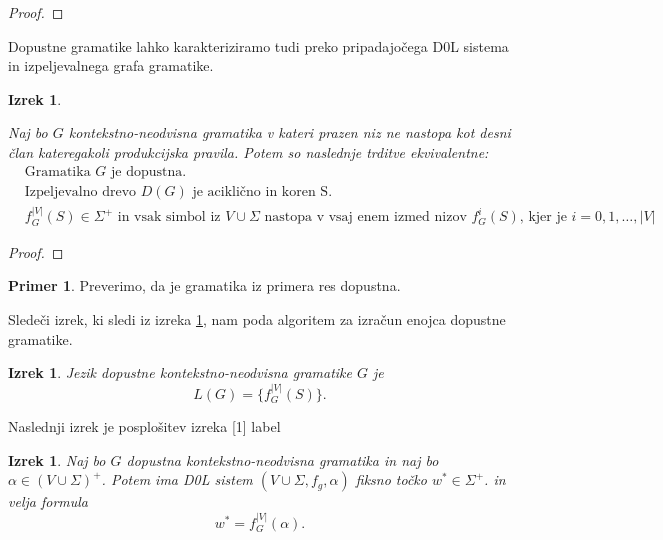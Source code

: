 \documentclass{amsart}
\theoremstyle{definition}
\newtheorem{primer}[definicija]{Primer}
\theoremstyle{plain} %
\newtheorem{izrek}[definicija]{Izrek}
\begin{document}
\begin{proof}

\end{proof}

Dopustne gramatike lahko karakteriziramo tudi preko pripadajočega D0L sistema in izpeljevalnega
grafa gramatike.

\begin{izrek}\label{ekvivalence}

    Naj bo $G$ kontekstno-neodvisna gramatika v kateri prazen niz ne nastopa kot desni član kateregakoli
    produkcijska pravila. Potem so naslednje trditve ekvivalentne:
    \begin{align}
        & \text{Gramatika } G \text{ je dopustna}. \\
        & \text{Izpeljevalno drevo } D(G) \text{ je aciklično in koren S}. \\
        & f_G^{|V|}(S) \in \Sigma^+ \text{ in vsak simbol iz } V \cup \Sigma \text{ nastopa v vsaj enem izmed nizov }
        f_G^i(S) \text{, kjer je } i = 0, 1, \ldots, |V|
    \end{align}

\end{izrek}

\setcounter{equation}{0}

\begin{proof}
    
\end{proof}

\begin{primer}
    Preverimo, da je gramatika iz primera res dopustna.
\end{primer}

Sledeči izrek, ki sledi iz izreka \ref{ekvivalence}, nam poda algoritem za izračun enojca dopustne gramatike.

\begin{izrek}

    Jezik dopustne kontekstno-neodvisna gramatike $G$ je
    \[
        L(G) = \{f_G^{|V|}(S) \}.
    \]

\end{izrek}

Naslednji izrek je posplošitev izreka [1] label 

\begin{izrek}

    Naj bo $G$ dopustna kontekstno-neodvisna gramatika in naj bo $ \alpha \in (V \cup \Sigma)^+ $.
    Potem ima D0L sistem $ (V \cup \Sigma, f_g, \alpha) $ fiksno točko $ w^* \in \Sigma^+ $. in velja formula
    \[
    w^* = f_G^{|V|}( \alpha ).
    \]
    
\end{izrek}
\end{document}

